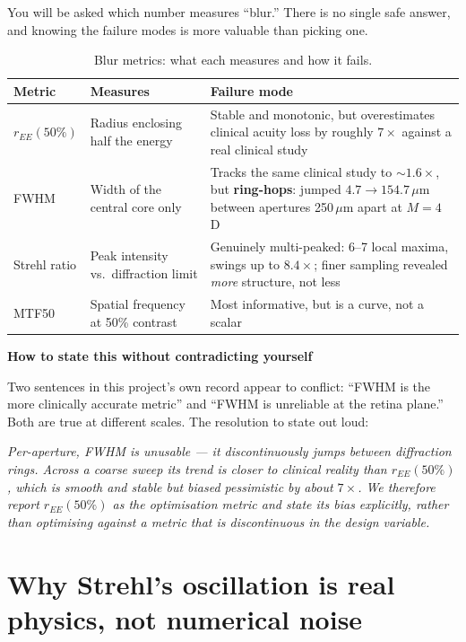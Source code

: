 \documentclass[11pt]{report}
\newenvironment{keybox}[1]%
{\par\vspace{8pt}\begin{lrbox}{\kbsave}\begin{minipage}{0.88\textwidth}%
{\bfseries\color{hbblue}#1}\par\vspace{4pt}\ignorespaces}%
{\end{minipage}\end{lrbox}%
\begin{center}\setlength{\fboxrule}{1.2pt}\setlength{\fboxsep}{8pt}%
\fcolorbox{hbblue}{boxgrey}{\usebox{\kbsave}}\end{center}\vspace{8pt}\par}
\begin{document}
You will be asked which number measures ``blur.'' There is no single safe answer, and knowing
the failure modes is more valuable than picking one.

\begin{longtable}{p{3.0cm}p{5.5cm}p{5.5cm}}
\caption{Blur metrics: what each measures and how it fails.}\\
\toprule
\textbf{Metric} & \textbf{Measures} & \textbf{Failure mode} \\
\midrule
\endhead
$r_{EE}(50\%)$ & Radius enclosing half the energy & Stable and monotonic, but overestimates
clinical acuity loss by roughly $7\times$ against a real clinical study \\
FWHM & Width of the central core only & Tracks the same clinical study to $\sim1.6\times$, but
\textbf{ring-hops}: jumped $4.7 \to 154.7\,\mu$m between apertures 250\,$\mu$m apart at $M=4$\,D \\
Strehl ratio & Peak intensity vs.\ diffraction limit & Genuinely multi-peaked: 6--7 local maxima,
swings up to $8.4\times$; finer sampling revealed \emph{more} structure, not less \\
MTF50 & Spatial frequency at 50\% contrast & Most informative, but is a curve, not a scalar \\
\bottomrule
\end{longtable}

\begin{keybox}{How to state this without contradicting yourself}
Two sentences in this project's own record appear to conflict: ``FWHM is the more clinically
accurate metric'' and ``FWHM is unreliable at the retina plane.'' Both are true at different
scales. The resolution to state out loud:

\emph{Per-aperture, FWHM is unusable --- it discontinuously jumps between diffraction rings.
Across a coarse sweep its trend is closer to clinical reality than $r_{EE}(50\%)$, which is
smooth and stable but biased pessimistic by about $7\times$. We therefore report $r_{EE}(50\%)$
as the optimisation metric and state its bias explicitly, rather than optimising against a
metric that is discontinuous in the design variable.}
\end{keybox}

\section{Why Strehl's oscillation is real physics, not numerical noise}
\end{document}
